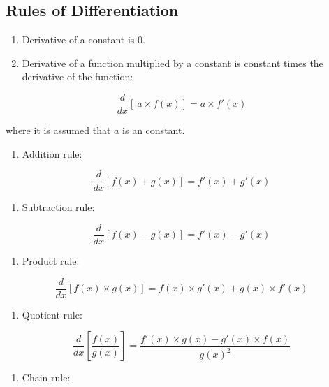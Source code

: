 \documentclass[
]{book}
\providecommand{\tightlist}{%
  \setlength{\itemsep}{0pt}\setlength{\parskip}{0pt}}
\theoremstyle{definition}
\theoremstyle{definition}
\theoremstyle{definition}
\theoremstyle{definition}
\theoremstyle{remark}
\begin{document}
\hypertarget{rules-of-differentiation}{%
\subsection{Rules of Differentiation}\label{rules-of-differentiation}}

\begin{enumerate}
\def\labelenumi{\arabic{enumi}.}
\item
  Derivative of a constant is \(0\).
\item
  Derivative of a function multiplied by a constant is constant times the derivative of the function:
\end{enumerate}

\[\frac{d}{dx} [\ a\times f(x)]=a\times f'(x)\]

where it is assumed that \(a\) is an constant.

\begin{enumerate}
\def\labelenumi{\arabic{enumi}.}
\setcounter{enumi}{2}
\tightlist
\item
  Addition rule:
\end{enumerate}

\[ \frac{d}{dx} [f(x)+ g(x)]=f'(x)+ g'(x) \]

\begin{enumerate}
\def\labelenumi{\arabic{enumi}.}
\setcounter{enumi}{3}
\tightlist
\item
  Subtraction rule:
\end{enumerate}

\[ \frac{d}{dx} [f(x)- g(x)]=f'(x)-g'(x) \]

\begin{enumerate}
\def\labelenumi{\arabic{enumi}.}
\setcounter{enumi}{4}
\tightlist
\item
  Product rule:
\end{enumerate}

\[ \frac{d}{dx} [f(x)\times g(x)]= f(x) \times g'(x) + g(x)\times f'(x)\]

\begin{enumerate}
\def\labelenumi{\arabic{enumi}.}
\setcounter{enumi}{5}
\tightlist
\item
  Quotient rule:
\end{enumerate}

\[ \frac{d}{dx} \left[\frac{f(x)}{g(x)}\right]=\frac{f'(x) \times g(x) - g'(x) \times f(x)}{g(x)^2}\]

\begin{enumerate}
\def\labelenumi{\arabic{enumi}.}
\setcounter{enumi}{6}
\tightlist
\item
  Chain rule:
\end{enumerate}
\end{document}
